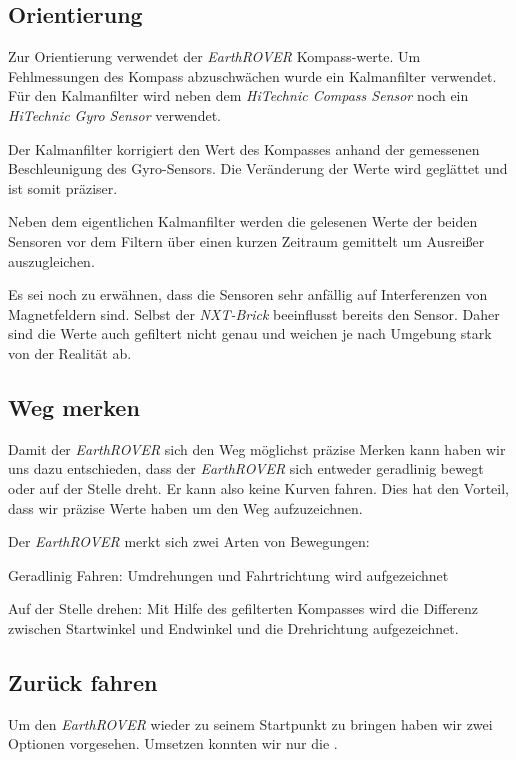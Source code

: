 \subsection{Orientierung}
Zur Orientierung verwendet der \textit{EarthROVER} Kompass-werte. Um Fehlmessungen des Kompass abzuschwächen wurde ein Kalmanfilter verwendet. Für den Kalmanfilter wird neben dem \textit{HiTechnic Compass Sensor} noch ein \textit{HiTechnic Gyro Sensor} verwendet.

Der Kalmanfilter korrigiert den Wert des Kompasses anhand der gemessenen Beschleunigung des Gyro-Sensors. Die Veränderung der Werte wird geglättet und ist somit präziser.

Neben dem eigentlichen Kalmanfilter werden die gelesenen Werte der beiden Sensoren vor dem Filtern über einen kurzen Zeitraum gemittelt um Ausreißer auszugleichen.

Es sei noch zu erwähnen, dass die Sensoren sehr anfällig auf Interferenzen von Magnetfeldern sind. Selbst der \textit{NXT-Brick} beeinflusst bereits den Sensor. Daher sind die Werte auch gefiltert nicht genau und weichen je nach Umgebung stark von der Realität ab.

\subsection{Weg merken}
Damit der \textit{EarthROVER} sich den Weg möglichst präzise Merken kann haben wir uns dazu entschieden, dass der \textit{EarthROVER} sich entweder geradlinig bewegt oder auf der Stelle dreht. Er kann also keine Kurven fahren. Dies hat den Vorteil, dass wir präzise Werte haben um den Weg aufzuzeichnen.

Der \textit{EarthROVER} merkt sich zwei Arten von Bewegungen:
\begin{capitemize}[Bewegungsarten]
	\item Geradlinig Fahren: Umdrehungen und Fahrtrichtung wird aufgezeichnet
	\item Auf der Stelle drehen: Mit Hilfe des gefilterten Kompasses wird die Differenz zwischen Startwinkel und Endwinkel und die Drehrichtung aufgezeichnet.
\end{capitemize}

\subsection{Zurück fahren}
Um den \textit{EarthROVER} wieder zu seinem Startpunkt zu bringen haben wir zwei Optionen vorgesehen. Umsetzen konnten wir nur die .

